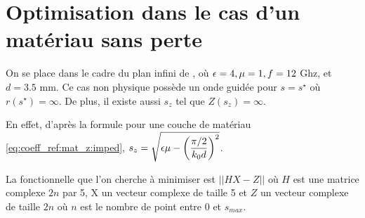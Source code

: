 \section{Optimisation dans le cas d'un matériau sans perte}

On se place dans le cadre du plan infini de \cite{soudais_3d_2017}, où $\epsilon=4,\mu=1,f=12$ Ghz, et $d=3.5$ mm. Ce cas non physique possède un onde guidée pour $s=s^\star$ où $r(s^\star) = \infty$. De plus, il existe aussi $s_z$ tel que $Z(s_z) = \infty$. 

En effet, d'après la formule pour une couche de matériau \eqref{eq:coeff_ref:mat_z:imped}, $s_z = \sqrt{\epsilon \mu - \left(\dfrac{\pi/2}{k_0 d}\right)^2}$. 

La fonctionnelle que l'on cherche à minimiser est $||H X - Z||$ où $H$ est une matrice complexe $2n$ par 5, X un vecteur complexe de taille 5 et $Z$ un vecteur complexe de taille $2n$ où $n$ est le nombre de point entre 0 et $s_{max}$. 